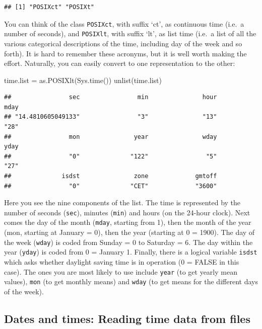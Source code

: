 \documentclass[
]{book}
\newenvironment{Shaded}{\begin{snugshade}}{\end{snugshade}}
\newcommand{\FunctionTok}[1]{\textcolor[rgb]{0.00,0.00,0.00}{#1}}
\newcommand{\NormalTok}[1]{#1}
\newcommand{\OtherTok}[1]{\textcolor[rgb]{0.56,0.35,0.01}{#1}}
\theoremstyle{definition}
\theoremstyle{definition}
\theoremstyle{definition}
\theoremstyle{definition}
\theoremstyle{remark}
\begin{document}
\begin{verbatim}
## [1] "POSIXct" "POSIXt"
\end{verbatim}

You can think of the class \texttt{POSIXct}, with suffix `ct', as continuous time (i.e.~a number of seconds), and
\texttt{POSIXlt}, with suffix `lt', as list time (i.e.~a list of all the various categorical descriptions of the time,
including day of the week and so forth). It is hard to remember these acronyms, but it is well worth making
the effort. Naturally, you can easily convert to one representation to the other:

\begin{Shaded}
\begin{Highlighting}[]
\NormalTok{time.list }\OtherTok{=} \FunctionTok{as.POSIXlt}\NormalTok{(}\FunctionTok{Sys.time}\NormalTok{())}
\FunctionTok{unlist}\NormalTok{(time.list)}
\end{Highlighting}
\end{Shaded}

\begin{verbatim}
##                sec                min               hour               mday 
## "14.4810605049133"                "3"               "13"               "28" 
##                mon               year               wday               yday 
##                "0"              "122"                "5"               "27" 
##              isdst               zone             gmtoff 
##                "0"              "CET"             "3600"
\end{verbatim}

Here you see the nine components of the list. The time is represented by the number of seconds (\texttt{sec}), minutes (\texttt{min}) and hours (on the 24-hour clock). Next comes the day of the month (\texttt{mday}, starting from 1), then the month of the year (mon, starting at January = 0), then the year (starting at 0 = 1900). The day of the week (\texttt{wday}) is coded from Sunday = 0 to Saturday = 6. The day within the year (\texttt{yday}) is coded from 0 = January 1. Finally, there is a logical variable \texttt{isdst} which asks whether daylight saving time is in operation (0 = FALSE in this case). The ones you are most likely to use include \texttt{year} (to get yearly mean values), \texttt{mon} (to get monthly means) and \texttt{wday} (to get means for the different days of the week).

\hypertarget{dates-and-times-reading-time-data-from-files}{%
\subsection{Dates and times: Reading time data from files}\label{dates-and-times-reading-time-data-from-files}}
\end{document}
